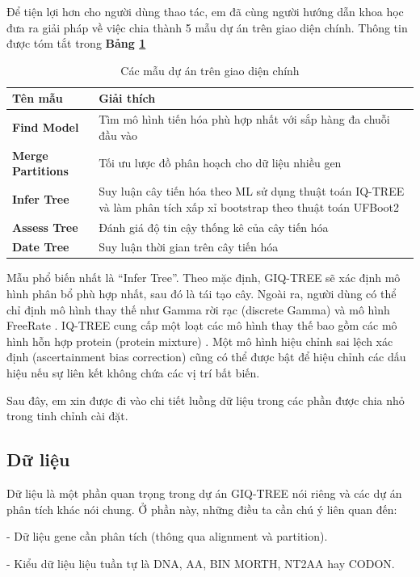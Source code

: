\documentclass[12pt]{report}
\begin{document}
Để tiện lợi hơn cho người dùng thao tác, em đã cùng người hướng dẫn khoa học đưa ra giải pháp về việc chia thành 5 mẫu dự án trên giao diện chính. Thông tin được tóm tắt trong \textbf{Bảng \ref{tbl:table4.2}}

\begin{longtable}[c]{|p{3cm}|p{12cm}|}
\caption{Các mẫu dự án trên giao diện chính}
\label{tbl:table4.2}
\hline
\textbf{Tên mẫu} & \textbf{Giải thích}  \\
\endfirsthead
%
\endhead
%
\hline
		\textbf{Find Model}              & Tìm mô hình tiến hóa phù hợp nhất với sắp hàng đa chuỗi đầu vào                         \\ \hline
		\textbf{Merge Partitions}             & Tối ưu lược đồ phân hoạch cho dữ liệu nhiều gen               \\ \hline
		\textbf{Infer Tree}           & Suy luận cây tiến hóa theo ML sử dụng thuật toán IQ-TREE và làm phân tích xấp xỉ bootstrap theo thuật toán UFBoot2    \\ \hline
		\textbf{Assess Tree}              & Đánh giá độ tin cậy thống kê của cây tiến hóa      \\ \hline
		\textbf{Date Tree}             & Suy luận thời gian trên cây tiến hóa     \\ \hline
\end{longtable}

Mẫu phổ biến nhất là “Infer Tree”. Theo mặc định, GIQ-TREE sẽ xác định mô hình phân bổ phù hợp nhất, sau đó là tái tạo cây. Ngoài ra, người dùng có thể chỉ định mô hình thay thế như Gamma rời rạc (discrete Gamma)   và mô hình FreeRate  . IQ-TREE cung cấp một loạt các mô hình thay thế bao gồm các mô hình hỗn hợp protein (protein mixture)   . Một mô hình hiệu chỉnh sai lệch xác định (ascertainment bias correction) cũng có thể được bật để hiệu chỉnh các dấu hiệu nếu sự liên kết không chứa các vị trí bất biến.

Sau đây, em xin được đi vào chi tiết luồng dữ liệu trong các phần được chia nhỏ trong tinh chỉnh cài đặt.

\subsection{Dữ liệu}
Dữ liệu là một phần quan trọng trong dự án GIQ-TREE nói riêng và các dự án phân tích khác nói chung. Ở phần này, những điều ta cần chú ý liên quan đến:

- Dữ liệu gene cần phân tích (thông qua alignment và partition).

- Kiểu dữ liệu liệu tuần tự là DNA, AA, BIN MORTH, NT2AA hay CODON.
\end{document}

